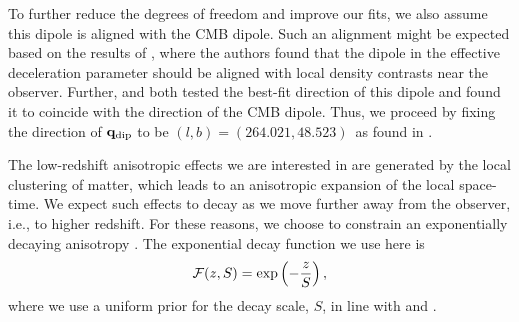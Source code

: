 \documentclass[fleqn,usenatbib]{mnras}
\begin{document}
{To further reduce the degrees of freedom and improve our fits,} we also assume {this dipole is aligned with} the CMB dipole. {Such an alignment might be expected based on the results of \citet{Heinesen_Macpherson_2021_Hubble_flow}, where the authors found that the dipole in the effective deceleration parameter should be aligned with local density contrasts near the observer. Further,  and \citet{Sarkar2019} both tested the best-fit direction of this dipole and found it to coincide with the direction of the CMB dipole. Thus, we proceed by fixing the direction of ${\bf q}_{\rm dip}$ to be $(l,b) = (264.021, 48.523)$\textdegree\ as found in \citet{aghanim2020planck}.} 

The {low-redshift} anisotropic effects we are %
{interested in} are generated by the local clustering of matter, {which leads} to an anisotropic expansion of the {local space-time}. %
{We expect such effects to decay as we move further away from the observer, i.e., to higher redshift.}
For these reasons, {we choose to constrain} an exponentially decaying anisotropy \citep[see][for fits using other forms of $\mathcal{F}$]{Sarkar2019}. 
The exponential decay function {we use here} is %
\begin{equation}\label{eq:decay_function}
    \mathcal{F}(z, S) = {\rm exp}\left(-\frac{z}{S}\right),   
\end{equation}
{where we use} a uniform prior for the decay {scale}, %
$S$, in line with \citet{rahman2021new} and .
\end{document}
